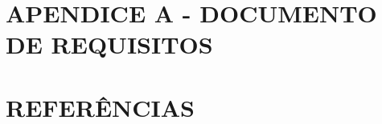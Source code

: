 \documentclass[
	12pt,				%
	openright,			%
	oneside,			%
	a4paper,			%
	chapter=TITLE,		%
	english,			%
	brazil				%
	]{abntex2}
\begin{document}
\chapter*{APENDICE A - DOCUMENTO DE REQUISITOS}




\chapter*{REFERÊNCIAS}
\renewcommand{\bibsection}{}





\printindex

\end{document}

